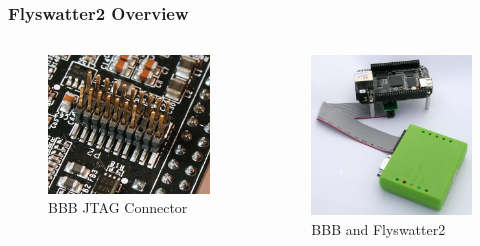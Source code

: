 \begin{frame}
  \frametitle{Flyswatter2 Overview}
  \begin{columns}
      \begin{figure}
        \centering
        \includegraphics[scale=0.3]{images/bbb-connector.jpg}
        \caption{BBB JTAG Connector}
      \end{figure}
      \begin{figure}
        \centering
        \includegraphics[scale=0.32]{images/bbb-and-flyswatter.jpg}
        \caption{BBB and Flyswatter2}
      \end{figure}
  \end{columns}
  \vspace*{-5mm}
\end{frame}

